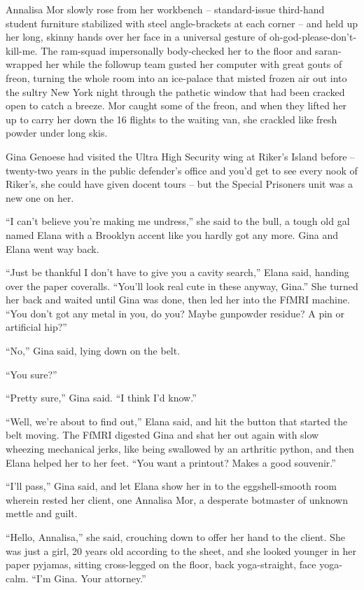 Annalisa Mor slowly rose from her workbench -- standard-issue 
third-hand student furniture stabilized with steel angle-brackets at 
each corner -- and held up her long, skinny hands over her face in a 
universal gesture of oh-god-please-don't-kill-me. The ram-squad 
impersonally body-checked her to the floor and saran-wrapped her while 
the followup team gusted her computer with great gouts of freon, 
turning the whole room into an ice-palace that misted frozen air out 
into the sultry New York night through the pathetic window that had 
been cracked open to catch a breeze. Mor caught some of the freon, and 
when they lifted her up to carry her down the 16 flights to the waiting 
van, she crackled like fresh powder under long skis.

\tb

Gina Genoese had visited the Ultra High Security wing at Riker's Island 
before -- twenty-two years in the public defender's office and you'd 
get to see every nook of Riker's, she could have given docent tours -- 
but the Special Prisoners unit was a new one on her.

“I can't believe you're making me undress,” she said to the bull, a 
tough old gal named Elana with a Brooklyn accent like you hardly got 
any more. Gina and Elana went way back.

“Just be thankful I don't have to give you a cavity search,” Elana 
said, handing over the paper coveralls. “You'll look real cute in 
these anyway, Gina.” She turned her back and waited until Gina was 
done, then led her into the FfMRI machine. “You don't got any metal 
in you, do you? Maybe gunpowder residue? A pin or artificial hip?”

“No,” Gina said, lying down on the belt.

“You sure?”

“Pretty sure,” Gina said. “I think I'd know.”

“Well, we're about to find out,” Elana said, and hit the button 
that started the belt moving. The FfMRI digested Gina and shat her out 
again with slow wheezing mechanical jerks, like being swallowed by an 
arthritic python, and then Elana helped her to her feet. “You want a 
printout? Makes a good souvenir.”

“I'll pass,” Gina said, and let Elana show her in to the 
eggshell-smooth room wherein rested her client, one Annalisa Mor, a 
desperate botmaster of unknown mettle and guilt.

“Hello, Annalisa,” she said, crouching down to offer her hand to 
the client. She was just a girl, 20 years old according to the sheet, 
and she looked younger in her paper pyjamas, sitting cross-legged on 
the floor, back yoga-straight, face yoga-calm. “I'm Gina. Your 
attorney.”

